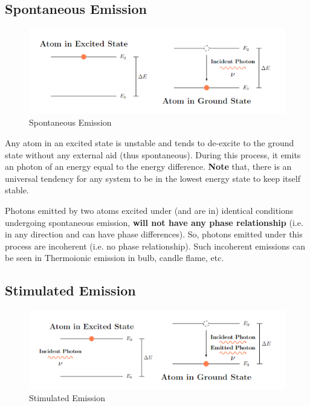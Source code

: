 \documentclass[12pt]{article}
\begin{document}
\subsection{Spontaneous Emission}

\begin{figure}[H]
    \centering
    \includegraphics[scale=0.5]{./img/04_spontaneous_emission.png}
    \caption{Spontaneous Emission}
\end{figure}

Any atom in an excited state is unstable and tends to de-excite to the ground state without any external aid (thus spontaneous). During this process, it emits an photon of an energy equal to the energy difference. \textbf{Note} that, there is an universal tendency for any system to be in the lowest energy state to keep itself stable.

Photons emitted by two atoms excited under (and are in) identical conditions undergoing spontaneous emission, \textbf{will not have any phase relationship} (i.e. in any direction and can have phase differences). So, photons emitted under this process are incoherent (i.e. no phase relationship). Such incoherent emissions can be seen in Thermoionic emission in bulb, candle flame, etc.

\subsection{Stimulated Emission}

\begin{figure}[H]
    \centering
    \includegraphics[scale=0.5]{./img/05_stimulated_emission.png}
    \caption{Stimulated Emission}
\end{figure}
\end{document}
